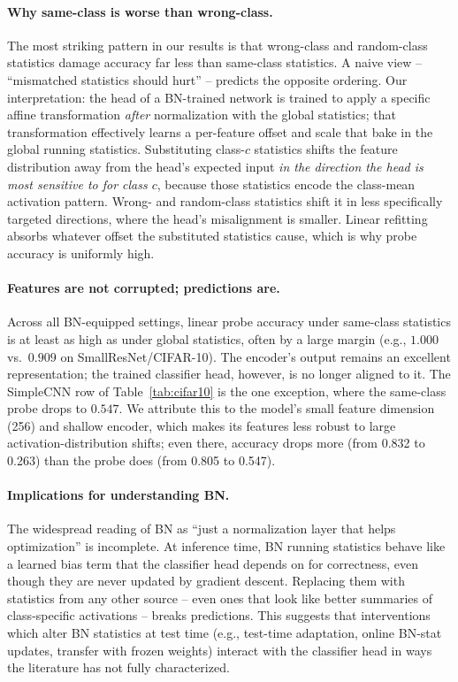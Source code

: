 \documentclass[11pt]{article}
\begin{document}
\paragraph{Why same-class is worse than wrong-class.}
The most striking pattern in our results is that wrong-class and random-class statistics damage accuracy far less than same-class statistics. A naive view -- ``mismatched statistics should hurt'' -- predicts the opposite ordering. Our interpretation: the head of a BN-trained network is trained to apply a specific affine transformation \emph{after} normalization with the global statistics; that transformation effectively learns a per-feature offset and scale that bake in the global running statistics. Substituting class-$c$ statistics shifts the feature distribution away from the head's expected input \emph{in the direction the head is most sensitive to for class $c$}, because those statistics encode the class-mean activation pattern. Wrong- and random-class statistics shift it in less specifically targeted directions, where the head's misalignment is smaller. Linear refitting absorbs whatever offset the substituted statistics cause, which is why probe accuracy is uniformly high.

\paragraph{Features are not corrupted; predictions are.}
Across all BN-equipped settings, linear probe accuracy under same-class statistics is at least as high as under global statistics, often by a large margin (e.g., $1.000$ vs.\ $0.909$ on SmallResNet/CIFAR-10). The encoder's output remains an excellent representation; the trained classifier head, however, is no longer aligned to it. The SimpleCNN row of Table~\ref{tab:cifar10} is the one exception, where the same-class probe drops to $0.547$. We attribute this to the model's small feature dimension (256) and shallow encoder, which makes its features less robust to large activation-distribution shifts; even there, accuracy drops more (from 0.832 to 0.263) than the probe does (from 0.805 to 0.547).

\paragraph{Implications for understanding BN.}
The widespread reading of BN as ``just a normalization layer that helps optimization'' is incomplete. At inference time, BN running statistics behave like a learned bias term that the classifier head depends on for correctness, even though they are never updated by gradient descent. Replacing them with statistics from any other source -- even ones that look like better summaries of class-specific activations -- breaks predictions. This suggests that interventions which alter BN statistics at test time (e.g., test-time adaptation, online BN-stat updates, transfer with frozen weights) interact with the classifier head in ways the literature has not fully characterized.
\end{document}
